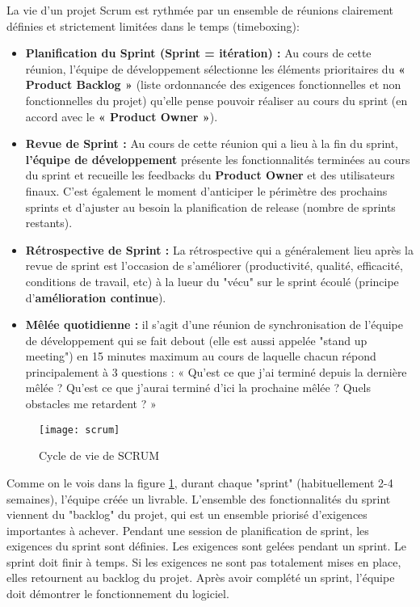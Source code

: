 La vie d'un projet Scrum est rythmée par un ensemble de réunions clairement définies et strictement limitées dans le temps (timeboxing):
\begin{itemize}
    \item \textbf{Planification du Sprint (Sprint = itération) :} Au cours de cette réunion, l'équipe de développement sélectionne les éléments prioritaires du \textbf{« Product Backlog »} (liste ordonnancée des exigences fonctionnelles et non fonctionnelles du projet) qu'elle pense pouvoir réaliser au cours du sprint (en accord avec le \textbf{« Product Owner »}).
    \item \textbf{Revue de Sprint : } Au cours de cette réunion qui a lieu à la fin du sprint, \textbf{l'équipe de développement} présente les fonctionnalités terminées au cours du sprint et recueille les feedbacks du \textbf{Product Owner} et des utilisateurs finaux. C'est également le moment d'anticiper le périmètre des prochains sprints et d'ajuster au besoin la planification de release (nombre de sprints restants).
    \item \textbf{Rétrospective de Sprint : }La rétrospective qui a généralement lieu après la revue de sprint est l'occasion de s'améliorer (productivité, qualité, efficacité, conditions de travail, etc) à la lueur du "vécu" sur le sprint écoulé (principe d'\textbf{amélioration continue}).
    \item \textbf{Mêlée quotidienne : }il s'agit d'une réunion de synchronisation de l'équipe de développement qui se fait debout (elle est aussi appelée "stand up meeting") en 15 minutes maximum au cours de laquelle chacun répond principalement à 3 questions : « Qu'est ce que j'ai terminé depuis la dernière mêlée ? Qu'est ce que j'aurai terminé d'ici la prochaine mêlée ? Quels obstacles me retardent ? »
\end{itemize}
\begin{figure}[H]
    \centering
    \texttt{[image: scrum]}
    \caption{Cycle de vie de SCRUM}
    \label{fig:scrum}
\end{figure}

Comme on le vois dans la figure \ref{fig:scrum}, durant chaque "sprint" (habituellement 2-4 semaines), l'équipe créée un livrable. L'ensemble des fonctionnalités du sprint viennent du "backlog" du projet, qui est un ensemble priorisé d'exigences importantes à achever. Pendant une session de planification de sprint, les exigences du sprint sont définies. Les exigences sont gelées pendant un sprint. Le sprint doit finir à temps. Si les exigences ne sont pas totalement mises en place, elles retournent au backlog du projet. Après avoir complété un sprint, l'équipe doit démontrer le fonctionnement du logiciel.

